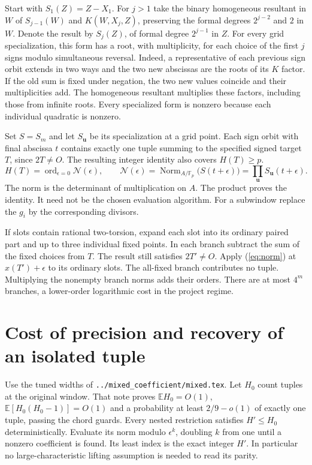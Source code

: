 \documentclass[11pt]{article}
\newcommand{\F}{\mathbb F}
\newcommand{\E}{\mathbb E}
\newcommand{\Nm}{\operatorname{Norm}}
\newcommand{\ord}{\operatorname{ord}}
\begin{document}
Start with $S_1(Z)=Z-X_1$. For $j>1$ take the binary homogeneous
resultant in $W$ of $S_{j-1}(W)$ and $K(W,X_j,Z)$, preserving the
formal degrees $2^{j-2}$ and $2$ in $W$. Denote the result by
$S_j(Z)$, of formal degree $2^{j-1}$ in $Z$. For every grid
specialization, this form has a root, with multiplicity, for each
choice of the first $j$ signs modulo simultaneous reversal.
Indeed, a representative of each previous sign orbit extends in
two ways and the two new abscissas are the roots of its $K$ factor.
If the old sum is fixed under negation, the two new values coincide
and their multiplicities add. The homogeneous resultant multiplies
these factors, including those from infinite roots. Every specialized
form is nonzero because each individual quadratic is nonzero.

Set $S=S_m$ and let $S_{\mathbf u}$ be its specialization at a grid
point. Each sign orbit with final abscissa $t$ contains exactly one
tuple summing to the specified signed target $T$, since $2T\ne O$.
The resulting integer identity also covers $H(T)\ge p$.
\begin{equation}
 H(T)=\ord_{\epsilon=0}\mathcal N(\epsilon),\qquad
 \mathcal N(\epsilon)=\Nm_{A/\F_p}\big(S(t+\epsilon)\big)
     =\prod_{\mathbf u}S_{\mathbf u}(t+\epsilon). \label{eq:norm}
\end{equation}
The norm is the determinant of multiplication on $A$. The product
proves the identity. It need not be the chosen evaluation algorithm.
For a subwindow replace the $g_i$ by the corresponding divisors.

If slots contain rational two-torsion, expand each slot into its
ordinary paired part and up to three individual fixed points. In
each branch subtract the sum of the fixed choices from $T$. The
result still satisfies $2T'\ne O$. Apply (\ref{eq:norm}) at
$x(T')+\epsilon$ to its ordinary slots. The all-fixed branch
contributes no tuple. Multiplying the nonempty branch norms adds
their orders. There are at most $4^m$ branches, a lower-order
logarithmic cost in the project regime.

\section{Cost of precision and recovery of an isolated tuple}
Use the tuned widths of \texttt{../mixed\_coefficient/mixed.tex}.
Let $H_0$ count tuples at the original window. That note proves
$\E H_0=O(1)$, $\E[H_0(H_0-1)]=O(1)$ and a probability at least
$2/9-o(1)$ of exactly one tuple, passing the chord guards.
Every nested restriction satisfies $H'\le H_0$ deterministically.
Evaluate its norm modulo $\epsilon^k$, doubling $k$ from one until
a nonzero coefficient is found. Its least index is the exact
integer $H'$. In particular no large-characteristic lifting
assumption is needed to read its parity.
\end{document}
